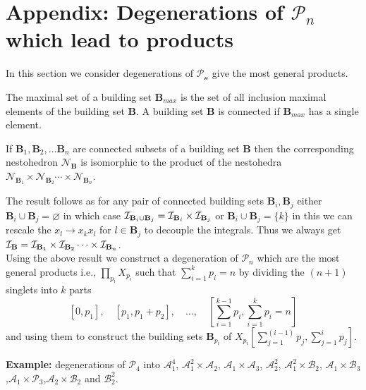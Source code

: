 \documentclass[hidelinks,12pt]{article}
\begin{document}
\appendix 

\section{Appendix: Degenerations of ${\mathscr P_n}$ which lead to products}\label{appendix:A}
In this section we consider degenerations of $\mathscr{P_n}$ give the most general products. 

The maximal set of a building set ${\mathbf B_{max}}$ is the set of all inclusion maximal elements of the building set ${\mathbf B}$. A building set ${\mathbf B}$ is connected if ${\mathbf B_{max}}$ has a single element\cite{Postnikov:2006}.

\vspace{1ex}

 If ${\mathbf B_1},{\mathbf B_2},\dots {\mathbf B_n}$ are connected subsets of a building set ${\mathbf B}$ then the corresponding nestohedron ${\mathscr N_{{\mathbf B}}}$ is isomorphic to the product of the nestohedra ${\mathscr N}_{ {\mathbf B_1}} \times{\mathscr N}_{ {\mathbf B_2}} \cdots \times {\mathscr N}_{{\mathbf B_n}}$\cite{Postnikov:2006}.

\vspace{1ex}

The result follows as for any pair of connected building sets ${\mathbf B_{i}},{\mathbf B_{j}}$ either  ${\mathbf B_{i}} \cup {\mathbf B_{j}} = \varnothing $ in which case ${\cal I}_{{\mathbf B_i}\cup {\mathbf B_j}} = {\cal I}_{\mathbf B_i} \times {\cal I}_{\mathbf B_j}$ or ${\mathbf B_{i}} \cup {\mathbf B_{j}} = \{k\}$ in this we can rescale the $x_l \rightarrow x_k x_l$ for $l \in {\mathbf B_{j}} $ to decouple the integrals. Thus we always get ${\cal I}_{\mathbf B}={\cal I}_{\mathbf B_1}\times{\cal I}_{\mathbf B_2}\cdots \times{\cal I}_{\mathbf B_n}$. \\
Using the above result we construct a degeneration of  ${\mathscr P_n}$ which are the most general products i.e., $\prod_{p_i} X_{p_i}$ such that $\sum^{k}_{i=1} p_{i} = n$ by dividing the $(n+1)$ singlets into $k$ parts 
\[
[0,p_1],\quad [p_1,p_1+p_2],\quad \dots ,\quad [\sum^{k-1}_{i=1}p_{i},\sum^{k}_{i=1}p_{i}= n]
\]
and using them to construct the building sets $\mathbf B_{p_i}$ of $X_{p_i}\left[\sum^{(i-1)}_{j=1}p_{j},\sum^{i}_{j=1}p_{j}\right].$ 

{\bf Example:} degenerations of ${\mathscr P_4}$ into ${\mathscr A_1^{4}}$, ${\mathscr A_1^2} \times{\mathscr A_2}$, ${\mathscr A_1} \times {\mathscr A_3}$, ${\mathscr A^{2}_2}$, ${\mathscr A_1^2} \times {\mathscr B_2}$, ${\mathscr A_1} \times {\mathscr B_3}$,${\mathscr A_1} \times {\mathscr P_3}$,$ {\mathscr A_2}\times {\mathscr B_2}$ and ${\mathscr B^{2}_2}$.
 
\end{document}
